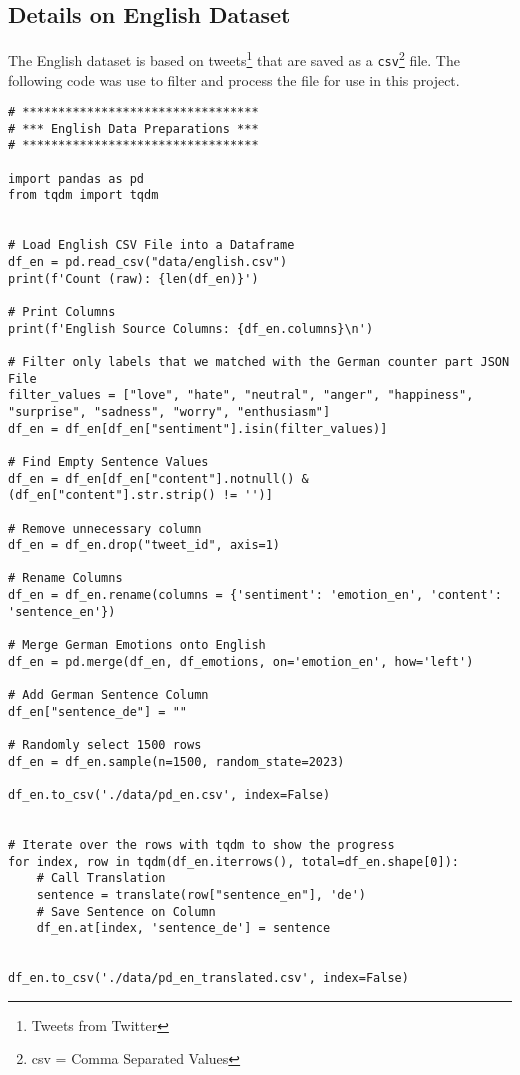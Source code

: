 \subsection{Details on English Dataset}
\label{appendix:dataset_english}
The English dataset is based on tweets\footnote{Tweets from Twitter} that are saved as a \texttt{csv}\footnote{csv = Comma Separated Values} file. The following code was use to filter and process the file for use in this project.
\begin{verbatim}
# *********************************
# *** English Data Preparations ***
# *********************************

import pandas as pd
from tqdm import tqdm


# Load English CSV File into a Dataframe
df_en = pd.read_csv("data/english.csv")
print(f'Count (raw): {len(df_en)}')

# Print Columns
print(f'English Source Columns: {df_en.columns}\n')

# Filter only labels that we matched with the German counter part JSON File
filter_values = ["love", "hate", "neutral", "anger", "happiness", "surprise", "sadness", "worry", "enthusiasm"]
df_en = df_en[df_en["sentiment"].isin(filter_values)]

# Find Empty Sentence Values
df_en = df_en[df_en["content"].notnull() & (df_en["content"].str.strip() != '')]

# Remove unnecessary column
df_en = df_en.drop("tweet_id", axis=1)

# Rename Columns
df_en = df_en.rename(columns = {'sentiment': 'emotion_en', 'content': 'sentence_en'})

# Merge German Emotions onto English
df_en = pd.merge(df_en, df_emotions, on='emotion_en', how='left')

# Add German Sentence Column
df_en["sentence_de"] = ""

# Randomly select 1500 rows
df_en = df_en.sample(n=1500, random_state=2023)

df_en.to_csv('./data/pd_en.csv', index=False)


# Iterate over the rows with tqdm to show the progress
for index, row in tqdm(df_en.iterrows(), total=df_en.shape[0]):
    # Call Translation
    sentence = translate(row["sentence_en"], 'de')
    # Save Sentence on Column
    df_en.at[index, 'sentence_de'] = sentence


df_en.to_csv('./data/pd_en_translated.csv', index=False)
\end{verbatim}
\clearpage

